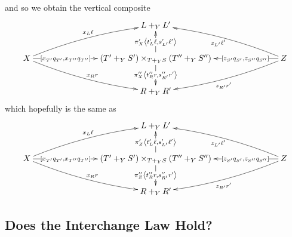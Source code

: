 \documentclass[12pt]{article}
\renewcommand{\(}{\left(}
\renewcommand{\)}{\right)}
\renewcommand{\{}{\left\lbrace}
\renewcommand{\}}{\right\rbrace}
\theoremstyle{remark}
\theoremstyle{definition}
\begin{document}
and so we obtain the vertical composite
\begin{equation} \label{Diag:HV_CompositeViaX}
	\xymatrix@C=1.25cm{
		{} &
		{} &
		L +_Y L' &
		{} &
		{} \\
		X 
			\ar@/^/[rru]^{x_L \ell}
			\ar[rr]|(.3){\left[ x_{T'}q_{T'}, x_{T''}q_{T''} \right] }
			\ar@/_/[rrd]^{x_R r} &
		{} &
		(T' +_Y S') \times_{T +_Y S} (T'' +_Y S'') 
			\ar[u]|{ \pi'_X \left\langle t'_L \ell, s'_{L'} \ell' \right\rangle  }
			\ar[d]|{ \pi''_X \left\langle t''_R r, s''_{R'}r'  \right\rangle } &
		{} &
		Z 
			\ar@/_/[llu]^{z_{L'}\ell'}
			\ar[ll]|(.3){\left[  z_{S'}q_{S'},z_{S''}q_{S''} \right]}
			\ar@/^/[lld]^{ z_{R'}r' } \\
		{} &
		{} &
		R +_Y R' &
		{} &
		{}
	}
\end{equation}
which hopefully is the same as
\begin{equation} \label{Diag:HV_CompositeViaZ}
	\xymatrix@C=1.25cm{
		{} &
		{} &
		L +_Y L' &
		{} &
		{} \\
		X 
			\ar@/^/[rru]^{x_L \ell}
			\ar[rr]
				|(.3){\left[ x_{T'}q_{T'}, x_{T''}q_{T''} \right] }
			\ar@/_/[rrd]^{x_R r} &
		{} &
		(T' +_Y S') \times_{T +_Y S} (T'' +_Y S'') 
			\ar[u]|{ \pi'_Z \left\langle t'_L \ell, s'_{L'} \ell' \right\rangle  }
			\ar[d]|{ \pi''_Z \left\langle t''_R r, s''_{R'}r'  \right\rangle } &
		{} &
		Z 
			\ar@/_/[llu]^{z_{L'}\ell'}
			\ar[ll]|(.3){\left[ z_{S'}q_{S'},z_{S''}q_{S''} \right]}
			\ar@/^/[lld]^{ z_{R'}r' }\\
		{} &
		{} &
		R +_Y R' &
		{} &
		{}
	}
\end{equation}

\subsection*{Does the Interchange Law Hold?}
\end{document}

